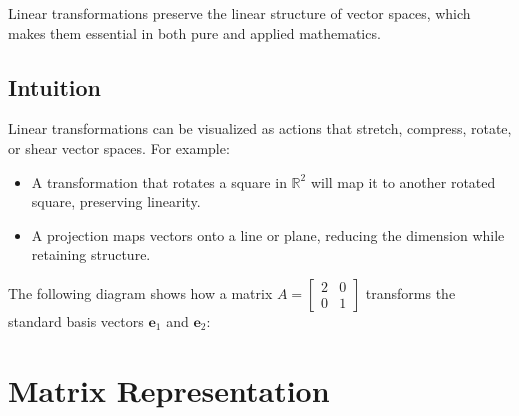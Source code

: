 \documentclass[11pt]{article}
\begin{document}
Linear transformations preserve the linear structure of vector spaces, which makes them essential in both pure and applied mathematics.

\subsection*{Intuition}

Linear transformations can be visualized as actions that stretch, compress, rotate, or shear vector spaces. For example:
\begin{itemize}
    \item A transformation that rotates a square in \( \mathbb{R}^2 \) will map it to another rotated square, preserving linearity.
    \item A projection maps vectors onto a line or plane, reducing the dimension while retaining structure.
\end{itemize}

The following diagram shows how a matrix \( A = \begin{bmatrix} 2 & 0 \\ 0 & 1 \end{bmatrix} \) transforms the standard basis vectors \( \mathbf{e}_1 \) and \( \mathbf{e}_2 \):

\begin{center}
\end{center}

\section{\textbf{Matrix Representation}}
\end{document}
